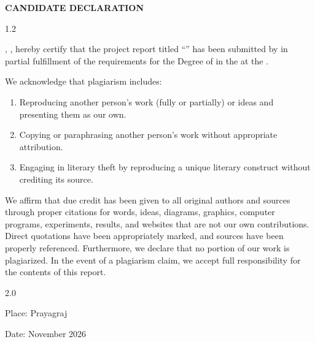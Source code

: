 \begin{center}
  {\large\bfseries CANDIDATE DECLARATION}
\end{center}

\begin{spacing}{1.2}

\noindent \pronounwe, \studentnamesdeclaration, hereby certify that the project report titled \enquote{\ttitle} has been submitted by \pronounus{} in partial fulfillment of the requirements for the Degree of \degreename{} in the \deptname{} at the \univname.

\par
\noindent We acknowledge that plagiarism includes:
\begin{enumerate}
  \item Reproducing another person's work (fully or partially) or ideas and presenting them as our own.
  \item Copying or paraphrasing another person's work without appropriate attribution.
  \item Engaging in literary theft by reproducing a unique literary construct without crediting its source.
\end{enumerate}
\par
We affirm that due credit has been given to all original authors and sources through proper citations for words, ideas, diagrams, graphics, computer programs, experiments, results, and websites that are not our own contributions. Direct quotations have been appropriately marked, and sources have been properly referenced. Furthermore, we declare that no portion of our work is plagiarized. In the event of a plagiarism claim, we accept full responsibility for the contents of this report.

\end{spacing}

\begin{spacing}{2.0}
\noindent
\begin{minipage}[t]{0.4\textwidth}
  \begin{flushleft}
    Place: Prayagraj\\
  \end{flushleft}
\end{minipage}
\hfill
\begin{minipage}[t]{0.4\textwidth}
  \begin{flushright}
    Date: November 2026\\
  \end{flushright}
\end{minipage}
\par
{\studentsignatures}
\end{spacing}

